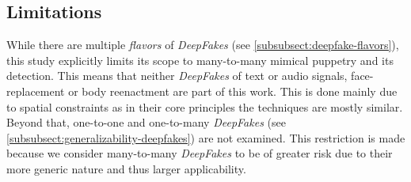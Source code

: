 \subsection{Limitations}\label{subsect:limitations}
While there are multiple \textit{flavors} of \textit{DeepFakes} (see \cref{subsubsect:deepfake-flavors}),
this study explicitly limits its scope to many-to-many mimical puppetry and its
detection. This means that neither \textit{DeepFakes} of text or audio signals,
face-replacement or body reenactment are part of this work. This is done mainly
due to spatial constraints as in their core principles the techniques are mostly
similar. Beyond that, one-to-one and one-to-many \textit{DeepFakes} (see \cref{subsubsect:generalizability-deepfakes})
are not examined. This restriction is made because we consider many-to-many \textit{DeepFakes}
to be of greater risk due to their more generic nature and thus larger applicability.
